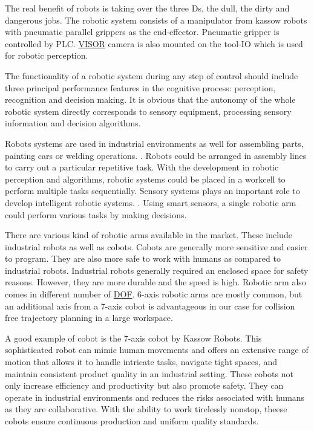 The real benefit of robots is taking over the three Ds, the dull, the dirty and dangerous jobs. \cite{jordan2016robots}
The robotic system consists of a manipulator from kassow robots with pneumatic parallel grippers as the end-effector.
Pneumatic gripper is controlled by PLC. \hyperref[acro:VISOR]{VISOR\textsuperscript{\textregistered}} camera is also mounted on the tool-IO which is used for robotic perception.

The functionality of a robotic system during any step of control should include three principal performance
features in the cognitive process: perception, recognition and decision making. 
It is obvious that the autonomy of the whole robotic system directly corresponds to sensory equipment, 
processing sensory information and decision algorithms. \cite{HAVLIK2011327}

Robots systems are used in industrial environments as well for assembling parts, painting cars or welding operations. \cite{SathishKumar2023, Wakizako}. Robots could be arranged in assembly lines to carry out a particular repetitive task. With the development in robotic perception and algorithms, robotic systems could be placed in a workcell to perform multiple tasks sequentially.
Sensory systems plays an important role to develop intelligent robotic systems. \cite{Wakizako}. Using smart sensors, a single robotic arm could perform various tasks by making decisions.

There are various  kind of robotic arms available in the market. These include industrial robots as well as cobots. Cobots are generally more sensitive and easier to program. They are also more safe to work with humans as compared to industrial robots. Industrial robots generally required an enclosed space for safety reasons. However, they are more durable and the speed is high. \cite{10201199}
Robotic arm also comes in different number of \hyperref[acro:DOF]{DOF}. 6-axis robotic arms are mostly common, but an additional axis from a 7-axis cobot is advantageous in our case for collision free trajectory planning in a large workspace. 

A good example of cobot is the 7-axis cobot by Kassow Robots. This sophisticated robot can mimic human movements and offers an extensive range of motion that allows it to handle intricate tasks, navigate tight spaces, and maintain consistent product quality in an industrial setting.
These cobots not only increase efficiency and productivity but also promote safety.
They can operate in industrial environments and reduces the risks associated with humans as they are collaborative. 
With the ability to work tirelessly nonstop, theese cobots ensure continuous production and uniform quality standards.
\cite{kassowrobotsblog}

